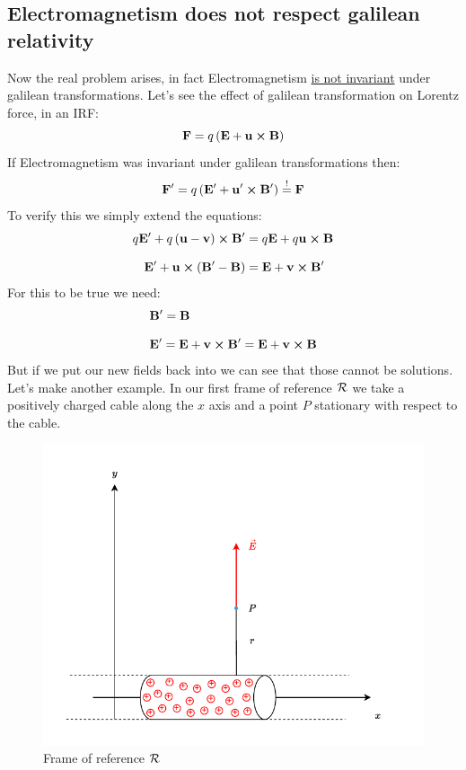 \subsection{Electromagnetism does not respect galilean relativity}
Now the real problem arises, in fact Electromagnetism \underline{is not invariant} under galilean transformations. Let's see the effect of galilean transformation on Lorentz force, in an IRF:
\begin{equation}
  \vb{F} = q\left(\vb{E} + \vb{u} \cross \vb{B}\right)
\end{equation}
If Electromagnetism was invariant under galilean transformations then:
\begin{equation}
  \vb{F}' = q\left(\vb{E}' + \vb{u}' \cross \vb{B}'\right) \overset{!}{=} \vb{F}
\end{equation}
To verify this we simply extend the equations:
\begin{equation}
  \begin{split}
    q\vb{E}' + q\left(\vb{u}-\vb{v}\right) \cross \vb{B}' &= q\vb{E} + q\vb{u}\cross \vb{B} \\[8pt]
    \vb{E}' + \vb{u} \cross \left(\vb{B}'-\vb{B}\right)  &= \vb{E} + \vb{v}\cross \vb{B}'
  \end{split}
\end{equation}
For this to be true we need:
\begin{equation} \label{e:false_conditions}
  \begin{split}
    &\vb{B}' = \vb{B}\\[8pt]
    &\vb{E}' = \vb{E} + \vb{v} \cross \vb{B}' = \vb{E} + \vb{v} \cross \vb{B}
  \end{split}
\end{equation}
But if we put our new fields back into \maxwellref\;we can see that those cannot be solutions.\\
Let's make another example. In our first frame of reference $\mathcal{R}$ we take a positively charged cable along the $x$ axis and a point $P$ stationary with respect to the cable.
\begin{figure}[H]
  \centering
  \includegraphics[width=0.6\linewidth]{res/svg/stationary_cable.drawio}
  \caption{Frame of reference $\mathcal{R}$}
\end{figure}
